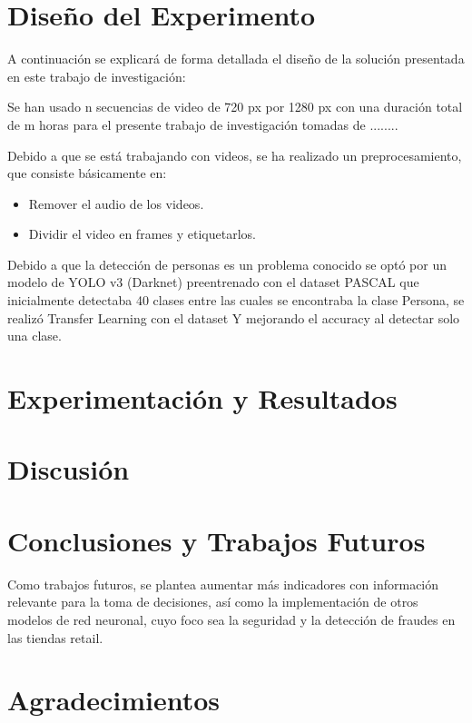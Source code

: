 \documentclass[conference]{IEEEtran}
\begin{document}
\section{Diseño del Experimento}
A continuación se explicará de forma detallada el diseño de la solución presentada en este trabajo de investigación:

Se han usado n secuencias de video  de 720 px por 1280 px con una duración total de m horas para el presente trabajo de investigación tomadas de ........

Debido a que se está trabajando con videos, se ha realizado un preprocesamiento, que consiste básicamente en:
\begin{itemize}
\item Remover el audio de los videos.
\item Dividir el video en frames y etiquetarlos.
\end{itemize}

Debido a que la detección de personas es un problema conocido se optó por un modelo de YOLO v3 (Darknet) preentrenado con el dataset PASCAL que inicialmente detectaba 40 clases entre las cuales se encontraba la clase Persona, se realizó Transfer Learning con el dataset Y mejorando el accuracy al detectar solo una clase.



\section{Experimentación y Resultados}

\section{Discusión}

\section{Conclusiones y Trabajos Futuros}

Como trabajos futuros, se plantea aumentar más indicadores con información relevante para la toma de decisiones, así como la implementación de otros modelos de red neuronal, cuyo foco sea la seguridad y la detección de fraudes en las tiendas retail.

\section*{Agradecimientos}



\end{document}
